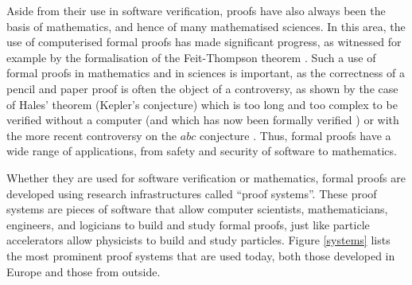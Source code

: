 Aside from their use in software verification, proofs have also always
been the basis of mathematics, and hence of many mathematised
sciences. In this area, the use of computerised formal proofs has made
significant progress, as witnessed for example by the formalisation of the
Feit-Thompson theorem \cite{Gonthier13}.  Such a use of formal proofs
in mathematics and in sciences is important, as the correctness of a
pencil and paper proof is often the object of a controversy, as shown
by the case of Hales' theorem (Kepler's conjecture) which is too long
and too complex to be verified without a computer (and which has now
been formally verified \cite{Hales17}) or with the more recent
controversy on the $abc$ conjecture \cite{Castelvecchi}. Thus, formal
proofs have a wide range of applications, from safety and security of
software to mathematics.

Whether they are used for software verification or mathematics, formal
proofs are developed using research infrastructures called
``proof systems''.  These proof systems are pieces of software that
allow computer scientists, mathematicians, engineers, and logicians to
build and study formal proofs, just like particle accelerators allow
physicists to build and study particles. Figure \ref{systems} lists
the most prominent proof systems that are used today, both those
developed in Europe and those from outside.

